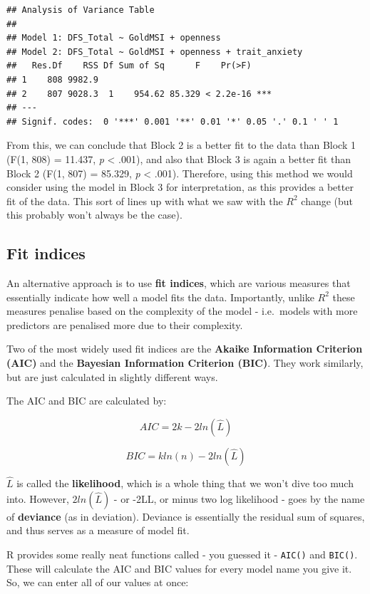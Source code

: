 \documentclass[
]{book}
\begin{document}
\begin{verbatim}
## Analysis of Variance Table
## 
## Model 1: DFS_Total ~ GoldMSI + openness
## Model 2: DFS_Total ~ GoldMSI + openness + trait_anxiety
##   Res.Df    RSS Df Sum of Sq      F    Pr(>F)    
## 1    808 9982.9                                  
## 2    807 9028.3  1    954.62 85.329 < 2.2e-16 ***
## ---
## Signif. codes:  0 '***' 0.001 '**' 0.01 '*' 0.05 '.' 0.1 ' ' 1
\end{verbatim}

From this, we can conclude that Block 2 is a better fit to the data than Block 1 (F(1, 808) = 11.437, \emph{p} \textless{} .001), and also that Block 3 is again a better fit than Block 2 (F(1, 807) = 85.329, \emph{p} \textless{} .001). Therefore, using this method we would consider using the model in Block 3 for interpretation, as this provides a better fit of the data. This sort of lines up with what we saw with the \(R^2\) change (but this probably won't always be the case).

\hypertarget{fit-indices}{%
\subsection{Fit indices}\label{fit-indices}}

An alternative approach is to use \textbf{fit indices}, which are various measures that essentially indicate how well a model fits the data. Importantly, unlike \(R^2\) these measures penalise based on the complexity of the model - i.e.~models with more predictors are penalised more due to their complexity.

Two of the most widely used fit indices are the \textbf{Akaike Information Criterion (AIC)} and the \textbf{Bayesian Information Criterion (BIC)}. They work similarly, but are just calculated in slightly different ways.

The AIC and BIC are calculated by:

\[
AIC = 2k -2 ln(\hat L)
\]

\[
BIC = k ln(n) - 2 ln (\hat L)
\]

\(\hat L\) is called the \textbf{likelihood}, which is a whole thing that we won't dive too much into. However, \(2 ln (\hat L)\) - or -2LL, or minus two log likelihood - goes by the name of \textbf{deviance} (as in deviation). Deviance is essentially the residual sum of squares, and thus serves as a measure of model fit.

R provides some really neat functions called - you guessed it - \texttt{AIC()} and \texttt{BIC()}. These will calculate the AIC and BIC values for every model name you give it. So, we can enter all of our values at once:
\end{document}
